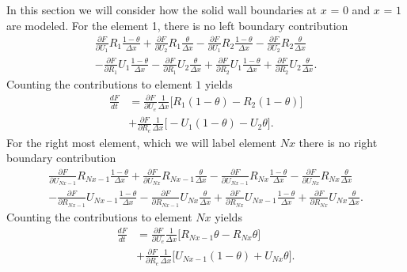 \documentclass[a4paper,11pt]{article}
\begin{document}
In this section we will consider  how the solid wall boundaries at $x$ = 0 and $x$ = $1$ are modeled. For the element 1, there is no left boundary contribution
\begin{equation}
\begin{aligned}
\frac{\partial F}{\partial U_{1}}R_{1}\frac{1-\theta}{\Delta x}  + \frac{\partial F}{\partial U_{2}}R_{1} \frac{\theta}{\Delta x} - \frac{\partial F}{\partial U_{1}}R_{2}\frac{1-\theta}{\Delta x}  -\frac{\partial F}{\partial U_{2}}R_{2} \frac{\theta}{\Delta x}\\
-\frac{\partial F}{\partial R_{1}}U_{1}\frac{1-\theta}{\Delta x}  -\frac{\partial F}{\partial R_{1}}U_{2} \frac{\theta}{\Delta x}+\frac{\partial F}{\partial R_{2}}U_{1}\frac{1-\theta}{\Delta x}  +\frac{\partial F}{\partial R_{2}}U_{2} \frac{\theta}{\Delta x}.
\end{aligned}
\end{equation}
Counting the contributions to element $1$ yields
\begin{equation}
\begin{aligned}
\frac{d F}{d t} &=\frac{\partial F}{\partial U_{e}}\frac{1}{\Delta x}\bigg [    R_{1}(1-\theta) - R_{2}(1-\theta)                    \bigg]\\
&+\frac{\partial F}{\partial R_{e}}\frac{1}{\Delta x}\bigg [     - U_{1}(1-\theta)   - U_{2} \theta      \bigg].
\end{aligned}
\end{equation}
For the right most element, which we will label element $Nx$ there is no right boundary contribution
\begin{equation}
\begin{aligned}
 \frac{\partial F}{\partial U_{Nx-1}}R_{Nx-1}\frac{1-\theta}{\Delta x}  + \frac{\partial F}{\partial U_{Nx}}R_{Nx-1} \frac{\theta}{\Delta x} - \frac{\partial F}{\partial U_{Nx-1}}R_{Nx}\frac{1-\theta}{\Delta x}  -\frac{\partial F}{\partial U_{Nx}}R_{Nx} \frac{\theta}{\Delta x}\\
-\frac{\partial F}{\partial R_{Nx-1}}U_{Nx-1}\frac{1-\theta}{\Delta x}  -\frac{\partial F}{\partial R_{Nx-1}}U_{Nx} \frac{\theta}{\Delta x}+\frac{\partial F}{\partial R_{Nx}}U_{Nx-1}\frac{1-\theta}{\Delta x}  +\frac{\partial F}{\partial R_{Nx}}U_{Nx} \frac{\theta}{\Delta x}.
\end{aligned}
\end{equation}
Counting the contributions to element $Nx$ yields
\begin{equation}
\begin{aligned}
\frac{d F}{d t}&=\frac{\partial F}{\partial U_{e}}\frac{1}{\Delta x}\bigg [    R_{Nx-1}\theta - R_{Nx}\theta                  \bigg]\\
&+\frac{\partial F}{\partial R_{e}} \frac{1}{\Delta x}\bigg [    U_{Nx-1}(1-\theta)    + U_{Nx}\theta           \bigg].
\end{aligned}
\end{equation}
\end{document}
